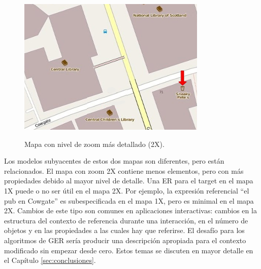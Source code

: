 \begin{figure}[h]
\begin{center}
\includegraphics[width=9cm]{images/with-zoom.jpg}\\[0pt]
\caption{Mapa con nivel de zoom m\'as detallado (2X).}
\label{fig-with-zoom}
\end{center}
\end{figure}


 Los modelos subyacentes de estos dos mapas son diferentes, pero est\'an relacionados. El mapa con zoom 2X contiene menos elementos, pero con m\'as propiedades debido al mayor nivel de detalle. Una ER para el target en el mapa 1X puede o no ser \'util en el mapa 2X. Por ejemplo, la expresi\'on referencial ``el pub en Cowgate'' es subespecificada en el mapa 1X, pero es minimal en el mapa 2X. Cambios de este tipo son comunes en aplicaciones interactivas: cambios en la estructura del contexto de referencia durante una interacci\'on, en el n\'umero de objetos y en las propiedades a las cuales hay que referirse. El desaf\'{i}o para los algoritmos de GER ser\'{i}a producir una descripci\'on apropiada para el contexto modificado sin empezar desde cero. Estos temas se discuten en mayor detalle en el Cap\'itulo \ref{sec:conclusiones}. 

